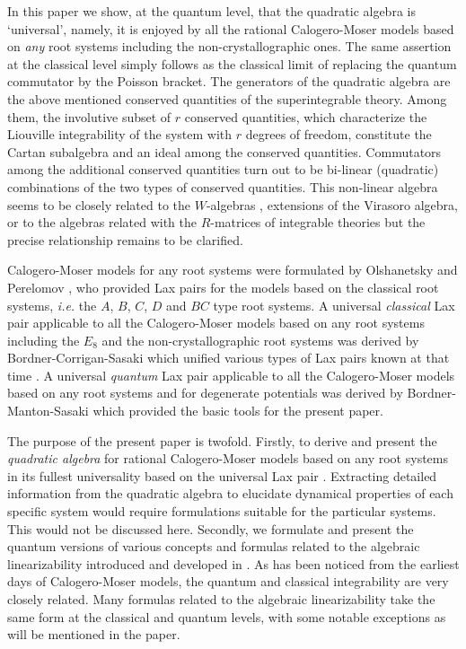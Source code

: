 \documentclass[a4paper,12pt]{article}
\begin{document}
In this paper we show, at the quantum level,
that the quadratic algebra is `universal', namely,  it is
enjoyed by all the  rational Calogero-Moser models based on {\em any}
root systems including the non-crystallographic ones.
The same assertion at the classical level simply follows as the
classical limit of replacing the quantum commutator by the Poisson
bracket.
The generators of the quadratic algebra are
 the  above mentioned conserved quantities of the
superintegrable theory. Among them, the involutive subset of $r$
conserved quantities, which characterize the Liouville integrability
of the system with $r$ degrees of freedom, constitute the Cartan
subalgebra and an ideal among the conserved quantities.
Commutators among the additional conserved quantities turn out to be
bi-linear
(quadratic)
 combinations of the two types of conserved quantities.
 This non-linear algebra seems to be closely related
to
the $W$-algebras \cite{Zam}, extensions of the Virasoro algebra,
or to the algebras related with  the $R$-matrices of integrable theories
\cite{Freidel-Maill} but
the precise relationship remains to be clarified.

Calogero-Moser models for any root systems were formulated by
Olshanetsky and Perelomov \cite{OP1}, who  provided Lax pairs
for the models based on the classical root systems, {\em i.e.\/}
the $A$, $B$, $C$, $D$ and $BC$ type root systems.
A universal {\em classical\/} Lax pair applicable to all
the Calogero-Moser models
based on any root systems including the $E_{8}$ and the
non-crystallographic root systems was derived by Bordner-Corrigan-Sasaki
\cite{bcs2}
which unified various types of Lax pairs known at
that time
\cite{DHoker_Phong, bcs1}.
A universal {\em quantum\/} Lax pair applicable to all the Calogero-Moser
models
based on any root systems and for degenerate potentials
 was derived by Bordner-Manton-Sasaki \cite{bms}
 which provided the basic tools
for the present paper.

The purpose of the present paper is twofold.
Firstly, to derive and present the
{\em quadratic algebra\/} for rational  Calogero-Moser models based on
any root systems in its fullest universality based on the universal
Lax pair \cite{bms}. Extracting detailed information from the
quadratic algebra to elucidate dynamical properties of each specific
system would require  formulations suitable for the
particular systems. This would not be discussed here. Secondly, we
formulate and present the quantum versions of
 various concepts and formulas
related to the algebraic linearizability introduced and
developed in
\cite{cfs}. As has been noticed from the earliest days of
Calogero-Moser models, the quantum and classical integrability
are very closely related. Many formulas related to  the
algebraic linearizability take the same form at the classical
and quantum levels, with some notable exceptions as will be
mentioned in the paper.
\end{document}
